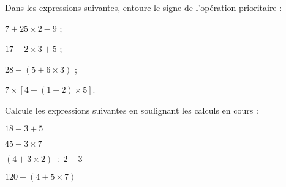 \begin{methode*1}


\exercice 
Dans les expressions suivantes, entoure le signe de l'opération prioritaire :
\begin{colenumerate}{2}
 \item $7 + 25 \times 2 - 9$ ;
 \item $17 - 2 \times 3 + 5$ ;
 \item $28 - (5 + 6 \times 3)$ ;
 \item $7 \times [4  + (1 + 2) \times 5]$.
 \end{colenumerate}
 
 \exercice 
Calcule les expressions suivantes en soulignant les calculs en cours :
\begin{colenumerate}{2}
 \item $18 - 3 + 5$ \dotfill

\dotfill
 \item $45 - 3 \times 7$ \dotfill

\dotfill
 \item $(4 + 3 \times 2) \div 2 - 3$ \dotfill

\dotfill
 \item $120 - (4 + 5 \times 7)$ \dotfill

\dotfill
 \end{colenumerate}


\end{methode*1}


